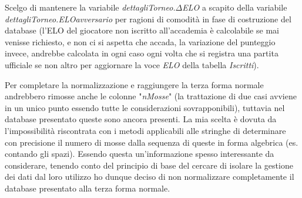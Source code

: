 \documentclass{article}
\begin{document}
    Scelgo di mantenere la variabile \textit{dettagliTorneo.$\Delta$ELO} a scapito della variabile \textit{dettagliTorneo.ELOavversario} per ragioni di comodità in fase di costruzione del database (l'ELO del giocatore non iscritto all'accademia è calcolabile se mai venisse richiesto, e non ci si aspetta che accada, la variazione del punteggio invece, andrebbe calcolata in ogni caso ogni volta che si registra una partita ufficiale se non altro per aggiornare la voce \textit{ELO} della tabella \textit{Iscritti}).


    Per completare la normalizzazione e raggiungere la terza forma normale andrebbero rimosse anche le colonne "\textit{nMosse}" (la trattazione di due casi avviene in un unico punto essendo tutte le considerazioni sovrapponibili), tuttavia nel database presentato queste sono ancora presenti. La mia scelta è dovuta da l'impossibilità riscontrata con i metodi applicabili alle stringhe di determinare con precisione il numero di mosse dalla sequenza di queste in forma algebrica (es. contando gli spazi). Essendo questa un'informazione spesso interessante da considerare, tenendo conto del principio di base del cercare di isolare la gestione dei dati dal loro utilizzo ho dunque deciso di non normalizzare completamente il database presentato alla terza forma normale.
\end{document}
